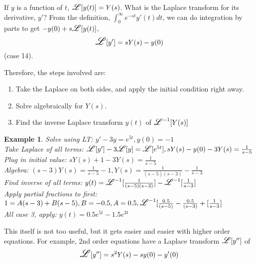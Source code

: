 \documentclass{article}
\newtheorem{example}{Example}
\newcommand\laplace{\mathlarger{\mathlarger{\mathscr{L}}}}
\begin{document}
If $y$ is a function of $t$, $\laplace[y(t)]=Y(s)$. What is the Laplace transform for its derivative, $y'$? From the definition, $\int_0^\infty e^{-st}y'(t)dt$, we can do 
integration by parts to get $-y(0)+s\laplace[y(t)]$, \begin{equation}\laplace[y']=sY(s)-y(0)\end{equation} (case 14).

Therefore, the steps involved are:
\begin{enumerate}
	\item Take the Laplace on both sides, and apply the initial condition right away.
	\item Solve algebraically for $Y(s)$.
	\item Find the inverse Laplace transform $y(t)$ of $\laplace^{-1}[Y(s)]$
\end{enumerate}

\begin{example}
	Solve using LT: $y'-3y=e^{5t}, y(0)=-1$\\
	Take Laplace of all terms: $\laplace[y']-3\laplace[y]=\laplace[e^{5t}], sY(s)-y(0)-3Y(s)=\frac{1}{s-5}$\\
	Plug in initial value: $sY(s)+1-3Y(s)=\frac{1}{s-5}$\\
	Algebra: $(s-3)Y(s)=\frac{1}{s-5}-1, Y(s)=\frac{1}{(s-5)(s-3)}-\frac{1}{s-3}$\\
	Find inverse of all terms: $y(t)=\laplace^{-1}[\frac{1}{(s-5)(s-3)}]-\laplace^{-1}[\frac{1}{s-3}]$\\
	Apply partial fractions to first: $1=A(s-3)+B(s-5), B=-0.5, A=0.5, \laplace^{-1}[\frac{0.5}{(s-5)}-\frac{0.5}{(s-3)}+[\frac{1}{s-3}]$\\
	All case 3, apply: $y(t)=0.5e^{5t}-1.5e^{3t}$
\end{example}

This itself is not too useful, but it gets easier and easier with higher order equations. For example, 2nd order equations have a Laplace transform $\laplace[y'']$
of \begin{equation} \laplace[y'']=s^2Y(s)-sy(0)-y'(0) \end{equation}
\end{document}
